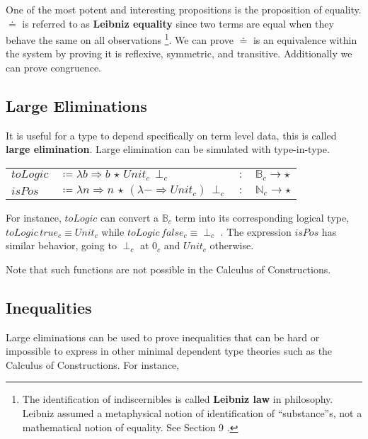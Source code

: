 One of the most potent and interesting propositions is the proposition of equality.
$\doteq$ is referred to as \textbf{Leibniz equality} since two terms are equal when they behave the same on all observations \footnote{The identification of indiscernibles is called \textbf{Leibniz law} in philosophy.
Leibniz assumed a metaphysical notion of identification of ``substance''s, not a mathematical notion of equality.
See Section 9 \cite{Leibniz1686}.}.
We can prove $\doteq$ is an equivalence within the system by proving it is reflexive, symmetric, and transitive.
Additionally we can prove congruence.


\subsection{Large Eliminations}


It is useful for a type to depend specifically on term level data, this is called \textbf{large elimination}.
Large elimination can be simulated with type-in-type.

\begin{tabular}{llll}
  $toLogic$ & $\coloneqq\lambda b\Rightarrow b\,\star\,Unit_{c}\,\perp_{c}$ & $:$ & $\mathbb{B}_{c}\rightarrow\star$\tabularnewline
  $isPos$ & $\coloneqq\lambda n\Rightarrow n\,\star\,(\lambda-\Rightarrow Unit_{c})\,\perp_{c}$ & $:$ & $\mathbb{N}_{c}\rightarrow\star$\tabularnewline
  \end{tabular}
  
For instance, $toLogic$ can convert a $\mathbb{B}_{c}$ term into its corresponding logical type, $toLogic\,true_{c}\equiv Unit_{c}$ while $toLogic\,false_{c}\equiv\perp_{c}$ .
The expression $isPos$ has similar behavior, going to $\perp_{c}$ at $0_{c}$ and $Unit_{c}$ otherwise.

Note that such functions are not possible in the Calculus of Constructions.

\subsection{Inequalities}

Large eliminations can be used to prove inequalities that can be hard or impossible to express in other minimal dependent type theories such as the Calculus of Constructions.
For instance,

